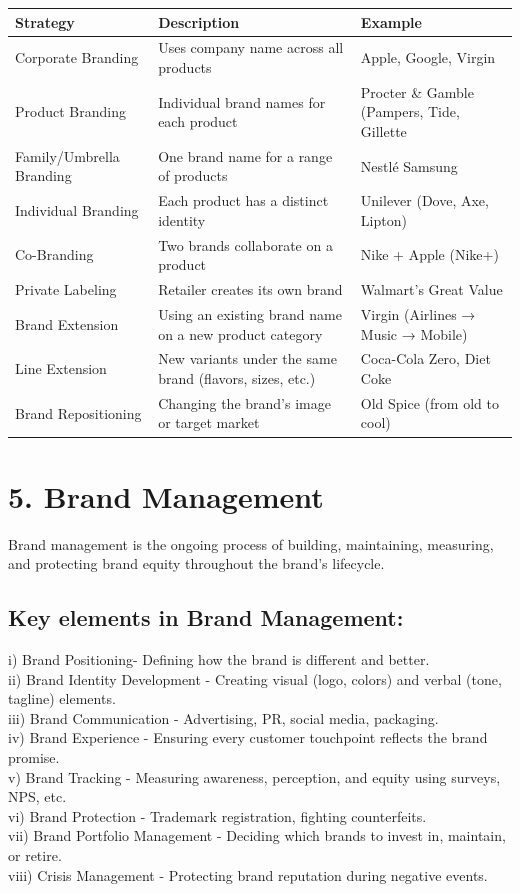 \documentclass[10pt]{article}
\begin{document}
\begin{center}
\begin{tabular}{|l|l|l|}
\hline
Strategy & Description & Example \\
\hline
Corporate Branding & Uses company name across all products & Apple, Google, Virgin \\
\hline
Product Branding & Individual brand names for each product & Procter \& Gamble (Pampers, Tide, Gillette \\
\hline
Family/Umbrella Branding & One brand name for a range of products & Nestlé Samsung \\
\hline
Individual Branding & Each product has a distinct identity & Unilever (Dove, Axe, Lipton) \\
\hline
Co-Branding & Two brands collaborate on a product & Nike + Apple (Nike+) \\
\hline
Private Labeling & Retailer creates its own brand & Walmart's Great Value \\
\hline
Brand Extension & Using an existing brand name on a new product category & Virgin (Airlines → Music → Mobile) \\
\hline
Line Extension & New variants under the same brand (flavors, sizes, etc.) & Coca-Cola Zero, Diet Coke \\
\hline
Brand Repositioning & Changing the brand's image or target market & Old Spice (from old to cool) \\
\hline
\end{tabular}
\end{center}

\section*{5. Brand Management}
Brand management is the ongoing process of building, maintaining, measuring, and protecting brand equity throughout the brand's lifecycle.

\subsection*{Key elements in Brand Management:}
i) Brand Positioning- Defining how the brand is different and better.\\
ii) Brand Identity Development - Creating visual (logo, colors) and verbal (tone, tagline) elements.\\
iii) Brand Communication - Advertising, PR, social media, packaging.\\
iv) Brand Experience - Ensuring every customer touchpoint reflects the brand promise.\\
v) Brand Tracking - Measuring awareness, perception, and equity using surveys, NPS, etc.\\
vi) Brand Protection - Trademark registration, fighting counterfeits.\\
vii) Brand Portfolio Management - Deciding which brands to invest in, maintain, or retire.\\
viii) Crisis Management - Protecting brand reputation during negative events.
\end{document}
